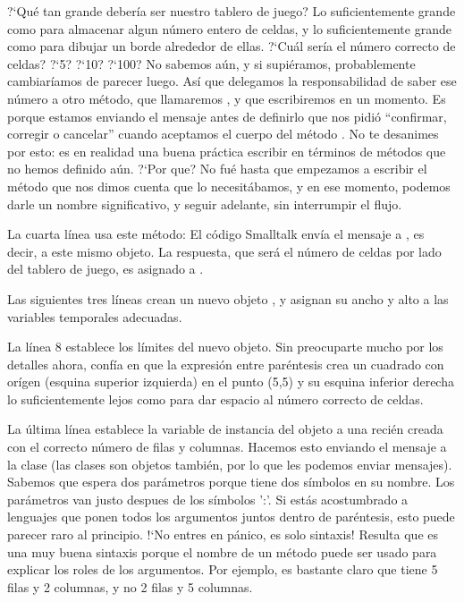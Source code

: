 \documentclass[a4paper,10pt,twoside]{book}
\begin{document}
?`Qu\'e tan grande deber\'ia ser nuestro tablero de juego? Lo suficientemente grande como para almacenar algun n\'umero entero de celdas, y lo suficientemente grande como para dibujar un borde alrededor de ellas.
?`Cu\'al ser\'ia el n\'umero correcto de celdas? ?`5? ?`10? ?`100? No sabemos a\'un, y si supi\'eramos, probablemente cambiar\'iamos de parecer luego. As\'i que delegamos la responsabilidad de saber ese n\'umero a otro m\'etodo, que llamaremos , y que escribiremos en un momento.
Es porque estamos enviando el mensaje  antes de definirlo que \pharo nos pidi\'o ``confirmar, corregir o cancelar'' cuando aceptamos el cuerpo del m\'etodo .
No te desanimes por esto: es en realidad una buena pr\'actica escribir en t\'erminos de m\'etodos que no hemos definido a\'un.
?`Por que? No fu\'e hasta que empezamos a escribir el m\'etodo  que nos dimos cuenta que lo necesit\'abamos, y en ese momento, podemos darle un nombre significativo, y seguir adelante, sin interrumpir el flujo.
 
La cuarta l\'inea usa este m\'etodo:
El c\'odigo Smalltalk  env\'ia el mensaje  a , es decir, a este mismo objeto.
La respuesta, que ser\'a el n\'umero de celdas por lado del tablero de juego, es asignado a .

Las siguientes tres l\'ineas crean un nuevo objeto , y asignan su ancho y alto a las variables temporales adecuadas. 

La l\'inea 8 establece los l\'imites del nuevo objeto.
Sin preocuparte mucho por los detalles ahora, conf\'ia en que la expresi\'on entre par\'entesis crea un cuadrado con or\'igen (\ie esquina superior izquierda) en el punto (5,5) y su esquina inferior derecha lo suficientemente lejos como para dar espacio al n\'umero correcto de celdas.

La \'ultima l\'inea establece la variable de instancia  del objeto  a una reci\'en creada  con el correcto n\'umero de filas y columnas. Hacemos esto enviando el mensaje  a la clase  (las clases son objetos tambi\'en, por lo que les podemos enviar mensajes). Sabemos que  espera dos par\'ametros porque tiene dos s\'imbolos \ct{:} en su nombre. Los par\'ametros van justo despues de los s\'imbolos ':'.
Si est\'as acostumbrado a lenguajes que ponen todos los argumentos juntos dentro de par\'entesis, esto puede parecer raro al principio. !`No entres en p\'anico, es solo sintaxis!
Resulta que es una muy buena sintaxis porque el nombre de un m\'etodo puede ser usado para explicar los roles de los argumentos. Por ejemplo, es bastante claro que  tiene 5 filas y 2 columnas, y no 2 filas y 5 columnas. 
\end{document}
